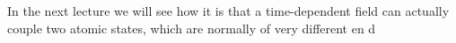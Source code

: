 In the next lecture we will see how it is that a time-dependent field can actually couple two atomic states, which are normally of very different en d